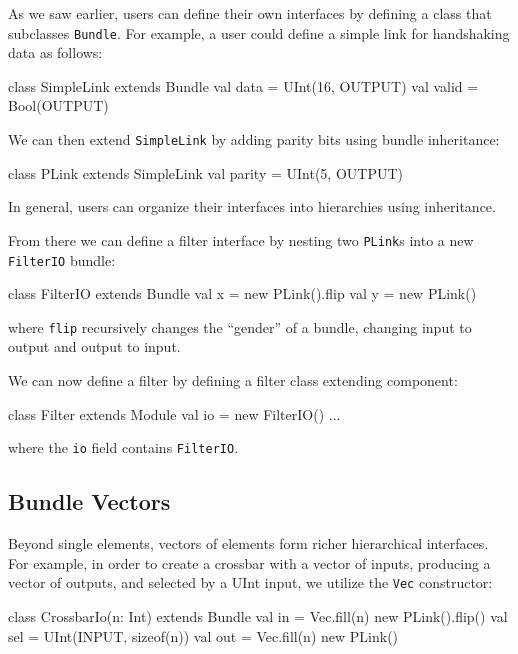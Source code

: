\documentclass[twocolumn,10pt]{article}
\begin{document}
As we saw earlier, users can define their own interfaces by defining a class that subclasses \verb+Bundle+.  
For example, a user could define a simple link for handshaking data as follows:

\begin{scala}
class SimpleLink extends Bundle { 
  val data  = UInt(16, OUTPUT) 
  val valid = Bool(OUTPUT)
}
\end{scala}

\noindent
We can then extend \verb+SimpleLink+ by adding parity bits using
bundle inheritance:

\begin{scala}
class PLink extends SimpleLink { 
  val parity = UInt(5, OUTPUT) 
}
\end{scala}

\noindent
In general, users can organize their interfaces into hierarchies using inheritance.  

From there we can define a filter interface by nesting two
\verb+PLink+s into a new \verb+FilterIO+ bundle:

\begin{scala}
class FilterIO extends Bundle { 
  val x = new PLink().flip
  val y = new PLink()
}
\end{scala}

\noindent
where \verb+flip+ recursively changes the ``gender'' of a bundle,
changing input to output and output to input.

We can now define a filter by defining a filter class extending component:

\begin{scala}
class Filter extends Module { 
  val io = new FilterIO()
  ...
}
\end{scala}

\noindent 
where the \verb+io+ field contains \verb+FilterIO+. 

\subsection{Bundle Vectors}

Beyond single elements, vectors of elements form richer hierarchical interfaces.  
For example, in order to create a crossbar with a vector of inputs, producing a vector of outputs, and selected by a UInt input, 
we utilize the \verb+Vec+ constructor:

\begin{scala}
class CrossbarIo(n: Int) extends Bundle {
  val in  = Vec.fill(n){ new PLink().flip() }
  val sel = UInt(INPUT, sizeof(n))
  val out = Vec.fill(n){ new PLink() }
}
\end{scala}
\end{document}
